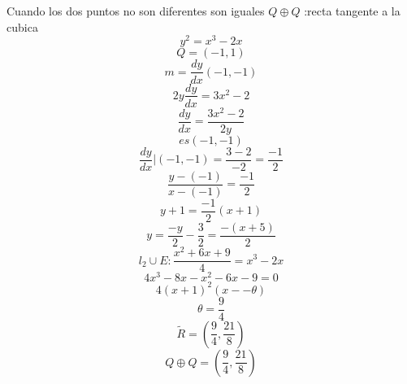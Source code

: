 \documentclass{article}
\begin{document}
\section{}
Cuando los dos puntos no son diferentes son iguales
$Q\oplus Q$ :recta tangente a la cubica 
\begin{equation*}
    y^{2}= x^{3}-2x
\end{equation*}
\begin{equation*}
    Q=(-1,1)
\end{equation*}
\begin{equation*}
    m=\frac{dy}{dx}(-1,-1)
\end{equation*}
\begin{equation*}
    2y\frac{dy}{dx}=3x^{2}-2
\end{equation*}
\begin{equation*}    
    \frac{dy}{dx}= \frac{3x^{2}-2}{2y}
\end{equation*}
\begin{equation*}
    es (-1,-1)
\end{equation*}
\begin{equation*}
    \frac{dy}{dx} \left| (-1,-1) \right. = \frac{3-2}{-2}= \frac{-1}{2}
\end{equation*}
\begin{equation*}
    \frac{y-(-1)}{x-(-1)} = \frac{-1}{2}
\end{equation*}
\begin{equation*}
    y+1 = \frac{-1}{2}(x+1)
\end{equation*}
\begin{equation*}
    y=\frac{-y}{2}-\frac{3}{2} = \frac{-(x+5)}{2}
\end{equation*}
\begin{equation*}
    l_{2} \cup E: \frac{x^{2}+6x+9}{4} = x^{3}-2x
\end{equation*}
\begin{equation*}
    4x^{3}-8x-x^{2}-6x-9=0
\end{equation*}
\begin{equation*}
    4(x+1)^2(x--\theta)
\end{equation*}
\begin{equation*}
    \theta = \frac{9}{4}
\end{equation*}
\begin{equation*}
    \widetilde{R} = (\frac{9}{4}, \frac{21}{8})
\end{equation*}
\begin{equation*}
    Q\oplus Q = (\frac{9}{4}, \frac{21}{8})
\end{equation*}
\end{document}
